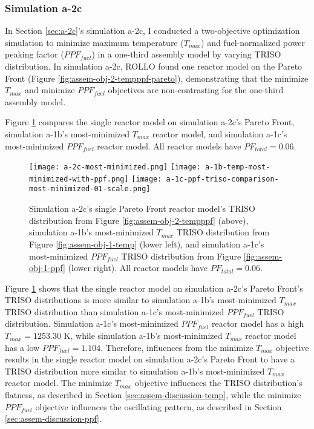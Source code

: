 \subsubsection{Simulation a-2c}
In Section \ref{sec:a-2c}'s simulation a-2c, I conducted a two-objective 
optimization simulation to minimize maximum temperature ($T_{max}$) and fuel-normalized 
power peaking factor ($PPF_{fuel}$) in a one-third assembly model by varying 
TRISO distribution. 
In simulation a-2c, ROLLO found one reactor model on the Pareto Front (Figure 
\ref{fig:assem-obj-2-tempppf-pareto}), demonstrating that the minimize $T_{max}$ and 
minimize $PPF_{fuel}$ objectives are non-contrasting for the one-third assembly model.

Figure \ref{fig:a-2c-triso-comparison} compares the single reactor model on simulation 
a-2c's Pareto Front, simulation a-1b's most-minimized $T_{max}$ reactor model, and 
simulation a-1c's most-minimized $PPF_{fuel}$ reactor model. 
All reactor models have $PF_{total}=0.06$.
\begin{figure}[htbp!]
    \centering
    \texttt{[image: a-2c-most-minimized.png]} 
    \texttt{[image: a-1b-temp-most-minimized-with-ppf.png]} 
    \texttt{[image: a-1c-ppf-triso-comparison-most-minimized-01-scale.png]} 
    \caption{Simulation a-2c's single Pareto Front reactor model's TRISO distribution 
    from Figure \ref{fig:assem-obj-2-tempppf} (above), simulation a-1b's most-minimized 
    $T_{max}$ TRISO distribution from Figure \ref{fig:assem-obj-1-temp} (lower left), and 
    simulation a-1c's most-minimized $PPF_{fuel}$ TRISO distribution from Figure 
    \ref{fig:assem-obj-1-ppf} (lower right).
    All reactor models have $PF_{total}=0.06$.}
    \label{fig:a-2c-triso-comparison}
\end{figure}

Figure \ref{fig:a-2c-triso-comparison} shows that the single reactor model on simulation 
a-2c's Pareto Front's TRISO distributions is more similar to simulation a-1b's 
most-minimized $T_{max}$ TRISO distribution than simulation a-1c's most-minimized 
$PPF_{fuel}$ TRISO distribution. 
Simulation a-1c's most-minimized $PPF_{fuel}$ reactor model has a high $T_{max}=1253.30$ 
K, while simulation a-1b's most-minimized $T_{max}$ reactor model has a low 
$PPF_{fuel}=1.104$. 
Therefore, influences from the minimize $T_{max}$ objective results in the single 
reactor model on simulation a-2c's Pareto Front to have a TRISO distribution more 
similar to simulation a-1b's most-minimized $T_{max}$ reactor model. 
The minimize $T_{max}$ objective influences the TRISO distribution's flatness, as 
described in Section \ref{sec:assem-discussion-temp}, while 
the minimize $PPF_{fuel}$ objective influences the oscillating pattern, as described 
in Section \ref{sec:assem-discussion-ppf}.

